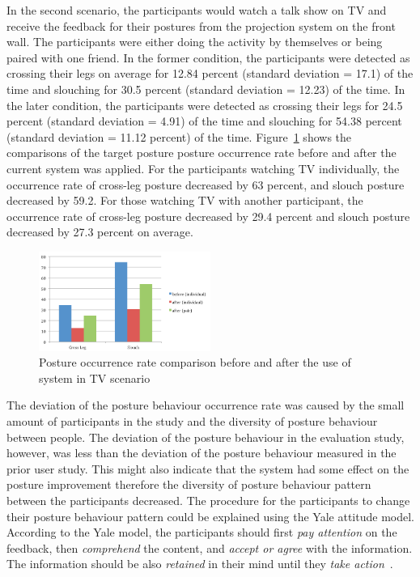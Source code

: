 In the second scenario, the participants would watch a talk show on TV and receive the feedback for their postures from the projection system on the front wall. The participants were either doing the activity by themselves or being paired with one friend. In the former condition, the participants were detected as crossing their legs on average for 12.84 percent (standard deviation = 17.1) of the time and slouching for 30.5 percent (standard deviation = 12.23) of the time. In the later condition, the participants were detected as crossing their legs for 24.5 percent (standard deviation = 4.91) of the time and slouching for 54.38 percent (standard deviation = 11.12 percent) of the time. Figure~\ref{fig:scenario_tv} shows the comparisons of the target posture posture occurrence rate before and after the current system was applied. For the participants watching TV individually, the occurrence rate of cross-leg posture decreased by 63 percent, and slouch posture decreased by 59.2. For those watching TV with another participant, the occurrence rate of cross-leg posture decreased by 29.4 percent and slouch posture decreased by 27.3 percent on average. 

\begin{figure}[h]
\centering
  \includegraphics[width=0.5\textwidth]{figs/scenario2}
\caption{Posture occurrence rate comparison before and after the use of system in TV scenario}
\label{fig:scenario_tv}
\end{figure}

The deviation of the posture behaviour occurrence rate was caused by the small amount of participants in the study and the diversity of posture behaviour between people. The deviation of the posture behaviour in the evaluation study, however, was less than the deviation of the posture behaviour measured in the prior user study. This might also indicate that the system had some effect on the posture improvement therefore the diversity of posture behaviour pattern between the participants decreased. The procedure for the participants to change their posture behaviour pattern could be explained using the Yale attitude model. According to the Yale model, the participants should first \textit{pay attention} on the feedback, then \textit{comprehend} the content, and \textit{accept or agree} with the information. The information should be also \textit{retained} in their mind until they \textit{take action}~\cite{communication_persuasion}.

